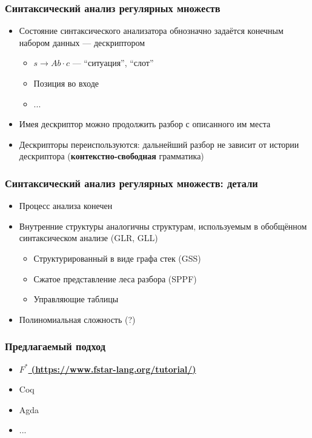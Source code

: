 \documentclass{beamer}
\begin{document}
\begin{frame}[fragile]
  \transwipe[direction=90]
  \frametitle{Синтаксический анализ регулярных множеств}
  \begin{itemize}
    \item Состояние синтаксического анализатора обнозначно задаётся конечным набором данных --- 
    дескриптором
    \begin{itemize}
       \item $s \rightarrow A b \cdot c$ --- ``ситуация'', ``слот''
       \item Позиция во входе
       \item ...
    \end{itemize}    
    \item Имея дескриптор можно продолжить разбор с описанного им места
    \item Дескрипторы переиспользуются: дальнейший разбор не зависит от истории дескриптора 
    (\textbf{контекстно-свободная} грамматика)
  \end{itemize}
\end{frame}


\begin{frame}
  \transwipe[direction=90]
  \frametitle{Синтаксический анализ регулярных множеств: детали}
  \begin{itemize}
    \item Процесс анализа конечен    
    \item Внутренние структуры аналогичны структурам, используемым в обобщённом синтаксическом 
    анализе (GLR, GLL)
    \begin{itemize}
       \item Структурированный в виде графа стек (GSS)
       \item Сжатое представление леса разбора (SPPF)
       \item Управляющие таблицы
    \end{itemize}
    \item Полиномиальная сложность (?)
  \end{itemize}
\end{frame}

\begin{frame}[fragile]
  \transwipe[direction=90]
  \frametitle{Предлагаемый подход}
  \begin{itemize}
    \item \underline{\bfseries{$F^*$} (\url{https://www.fstar-lang.org/tutorial/})}
    \item Coq
    \item Agda
    \item ...
  \end{itemize}
\end{frame}
\end{document}
